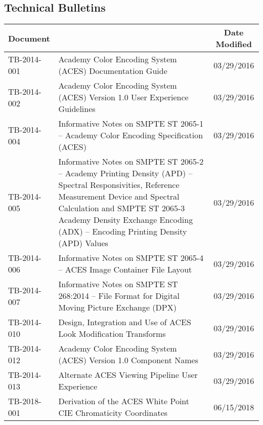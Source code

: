 \documentclass[10pt]{academydoc}
\begin{document}
\subsection*{Technical Bulletins}
\begin{tabularx}{\linewidth}{|l X|c|}
\hline
\textbf{Document} & & \textbf{Date Modified} \\ \hline
TB-2014-001 & Academy Color Encoding System (ACES) Documentation Guide & 03/29/2016 \\ \hline
TB-2014-002 & Academy Color Encoding System (ACES) Version 1.0 User Experience Guidelines & 03/29/2016 \\ \hline
TB-2014-004 & Informative Notes on SMPTE ST 2065-1 -- Academy Color Encoding Specification (ACES) & 03/29/2016 \\ \hline
TB-2014-005 & Informative Notes on SMPTE ST 2065-2 -- Academy Printing Density (APD) -- Spectral Responsivities, Reference Measurement Device and Spectral Calculation and SMPTE ST 2065-3 Academy Density Exchange Encoding (ADX) -- Encoding Printing Density (APD) Values & 03/29/2016 \\ \hline
TB-2014-006 & Informative Notes on SMPTE ST 2065-4 -- ACES Image Container File Layout & 03/29/2016 \\ \hline
TB-2014-007 & Informative Notes on SMPTE ST 268:2014 -- File Format for Digital Moving Picture Exchange (DPX) & 03/29/2016 \\ \hline
TB-2014-010 & Design, Integration and Use of ACES Look Modification Transforms & 03/29/2016 \\ \hline
TB-2014-012 & Academy Color Encoding System (ACES) Version 1.0 Component Names & 03/29/2016 \\ \hline
TB-2014-013 & Alternate ACES Viewing Pipeline User Experience & 03/29/2016 \\ \hline
TB-2018-001 & Derivation of the ACES White Point CIE Chromaticity Coordinates & 06/15/2018 \\ \hline
\end{tabularx}
\end{document}
